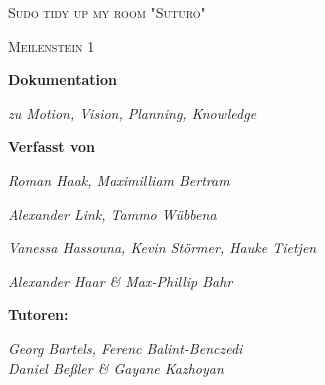 \documentclass[12pt,a4paper]{report}
\begin{document}
\begin{titlepage}
	\centering
	{\scshape\LARGE Sudo tidy up my room "Suturo" \par}
	\vspace{1.5cm}
	{\scshape\Large Meilenstein 1\par}
	\vspace{1.5cm}
	{\huge\bfseries Dokumentation \par}
	\vspace{2cm}
	{\small\itshape zu Motion, Vision, Planning, Knowledge\par}
	\vspace{2.5cm}
	{\normalsize\bfseries Verfasst von \par}
	{\small\itshape Roman Haak, Maximilliam Bertram\par}
	{\small\itshape Alexander Link, Tammo W\"ubbena\par}
	{\small\itshape Vanessa Hassouna, Kevin St\"ormer, Hauke Tietjen\par}	
	{\small\itshape Alexander Haar \&  Max-Phillip Bahr\par}	
	\vspace{2.5cm}
	{\normalsize\bfseries Tutoren: \par}
	{\small\itshape Georg Bartels, Ferenc Balint-Benczedi \\ Daniel Beßler \& Gayane Kazhoyan\par}


	\vfill
\end{titlepage}
\end{document}
